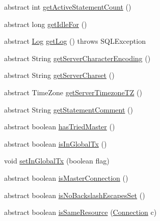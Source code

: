 \begin{DoxyCompactItemize}
abstract int \mbox{\hyperlink{interfacecom_1_1mysql_1_1jdbc_1_1_connection_a7a8d8535f6988783755465a542f45ea1}{get\+Active\+Statement\+Count}} ()
\item 
abstract long \mbox{\hyperlink{interfacecom_1_1mysql_1_1jdbc_1_1_connection_ae3e5825f1ce28db5688c14a0ddbd95f9}{get\+Idle\+For}} ()
\item 
abstract \mbox{\hyperlink{interfacecom_1_1mysql_1_1jdbc_1_1log_1_1_log}{Log}} \mbox{\hyperlink{interfacecom_1_1mysql_1_1jdbc_1_1_connection_a1cca3272f995742c608a1646e1433704}{get\+Log}} ()  throws S\+Q\+L\+Exception
\item 
abstract String \mbox{\hyperlink{interfacecom_1_1mysql_1_1jdbc_1_1_connection_ab6e0170645e189b8622642705f7cc3a4}{get\+Server\+Character\+Encoding}} ()
\item 
abstract String \mbox{\hyperlink{interfacecom_1_1mysql_1_1jdbc_1_1_connection_a1831e47e0daa7d5a4b362219105a85ec}{get\+Server\+Charset}} ()
\item 
abstract Time\+Zone \mbox{\hyperlink{interfacecom_1_1mysql_1_1jdbc_1_1_connection_aa824ea2a868be95bd6a21119445838b8}{get\+Server\+Timezone\+TZ}} ()
\item 
abstract String \mbox{\hyperlink{interfacecom_1_1mysql_1_1jdbc_1_1_connection_a9db688dc671cce2bd98b3f34128981f8}{get\+Statement\+Comment}} ()
\item 
abstract boolean \mbox{\hyperlink{interfacecom_1_1mysql_1_1jdbc_1_1_connection_a2bc23d62512f6dfaac0566369a0125df}{has\+Tried\+Master}} ()
\item 
abstract boolean \mbox{\hyperlink{interfacecom_1_1mysql_1_1jdbc_1_1_connection_a78a9a11946443467d3fbc7838922a205}{is\+In\+Global\+Tx}} ()
\item 
void \mbox{\hyperlink{interfacecom_1_1mysql_1_1jdbc_1_1_connection_ae5192425468c89f3d404ed0dece17cfc}{set\+In\+Global\+Tx}} (boolean flag)
\item 
abstract boolean \mbox{\hyperlink{interfacecom_1_1mysql_1_1jdbc_1_1_connection_a39d6c162da8f21b7c2a3299f91e7c65a}{is\+Master\+Connection}} ()
\item 
abstract boolean \mbox{\hyperlink{interfacecom_1_1mysql_1_1jdbc_1_1_connection_a3465592f69365c9572cc404ae04375b4}{is\+No\+Backslash\+Escapes\+Set}} ()
\item 
abstract boolean \mbox{\hyperlink{interfacecom_1_1mysql_1_1jdbc_1_1_connection_a3663c7e933a14a8cc26e16d0f78956a6}{is\+Same\+Resource}} (\mbox{\hyperlink{interfacecom_1_1mysql_1_1jdbc_1_1_connection}{Connection}} c)
\item 

\end{DoxyCompactItemize}
